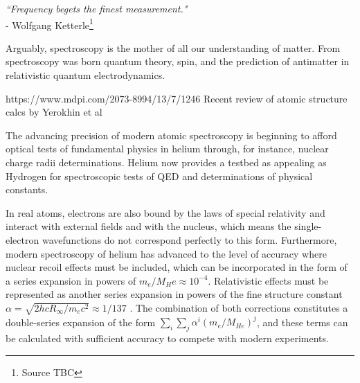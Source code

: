 \begin{adjustwidth}{4cm}{0cm}
\begin{flushright}
\emph{``Frequency begets the finest measurement."\\} 
- Wolfgang Ketterle\footnote{Source TBC}
\end{flushright}
\end{adjustwidth}

Arguably, spectroscopy is the mother of all our understanding of matter. From spectroscopy was born quantum theory, spin, and the prediction of antimatter in relativistic quantum electrodynamics.

https://www.mdpi.com/2073-8994/13/7/1246 Recent review of atomic structure calcs by Yerokhin et al


The advancing precision of modern atomic spectroscopy is beginning to afford optical tests of fundamental physics in helium through, for instance, nuclear charge radii determinations.
	Helium now provides a testbed as appealing as Hydrogen for spectroscopic tests of QED and determinations of physical constants.

	
In real atoms, electrons are also bound by the laws of special relativity and interact with external fields and with the nucleus, which means the single-electron wavefunctions do not correspond perfectly to this form.
	Furthermore, modern spectroscopy of helium has advanced to the level of accuracy where nuclear recoil effects must be included, which can be incorporated in the form of a series expansion in powers of  $m_e/M_He\approx10^{-4}$.
	Relativistic effects must be represented as another series expansion in powers of the fine structure constant $\alpha=\sqrt{2h c R_\infty/m_e c^2}\approx1/137$ .
	The combination of both corrections constitutes a double-series expansion of the form $\sum_i\sum_j \alpha^i(m_e/M_{He})^j$, and these terms can be calculated with sufficient accuracy to compete with modern experiments.


